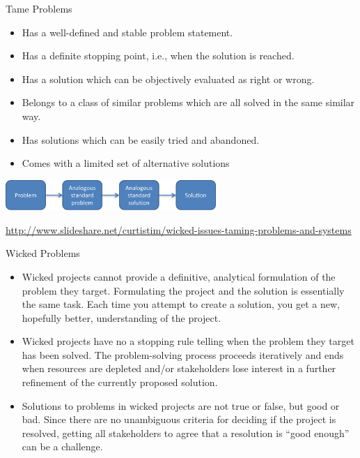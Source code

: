 \documentclass{beamer}
\begin{document}

\begin{frame}{\centerline{Tame Problems}}
\begin{itemize}
\item Has a well-defined and stable problem statement.
\item Has a definite stopping point, i.e., when the solution is reached.
\item Has a solution which can be objectively evaluated as right or wrong.
\item Belongs to a class of similar problems which are all solved in the same similar way.
\item Has solutions which can be easily tried and abandoned.
\item Comes with a limited set of alternative solutions
\end{itemize}
\begin{center}
\includegraphics[width=80mm]{A2022.IDSEPC.ProcessoDiProduzione/pic-04.png}
\end{center}

\begin{center}
\tiny
\url{http://www.slideshare.net/curtistim/wicked-issues-taming-problems-and-systems}
\end{center}

\end{frame}


\begin{frame}{\centerline{Wicked Problems}}
\small
\begin{itemize}
\item Wicked projects cannot provide a definitive, analytical formulation of the problem they target. Formulating the project and the solution is essentially the same task. Each time you attempt to create a solution, you get a new, hopefully better, understanding of the project.

\item Wicked projects have no a stopping rule telling when the problem they target has been solved. The problem-solving process proceeds iteratively and ends when resources are depleted and/or stakeholders lose interest in a further refinement of the currently proposed solution.

\item Solutions to problems in wicked projects are not true or false, but good or bad. Since there are no unambiguous criteria for deciding if the project is resolved, getting all stakeholders to agree that a resolution is ``good enough'' can be a challenge.
\end{itemize}

\end{frame}
\end{document}
